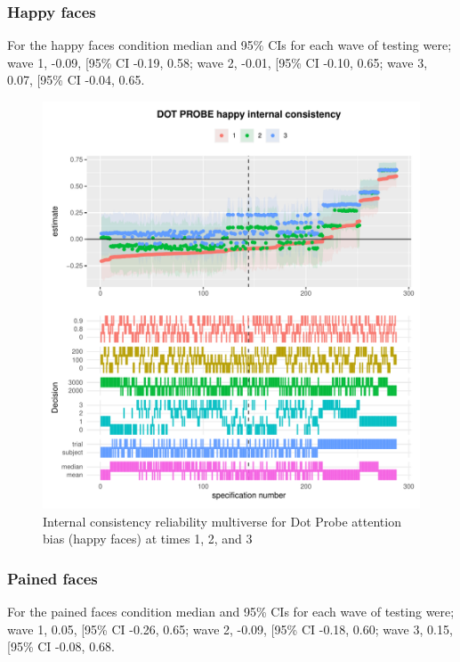 \documentclass[
  english,
  man,floatsintext]{apa6}
\begin{document}
\newpage

\hypertarget{happy-faces}{%
\subsubsection{Happy faces}\label{happy-faces}}

For the happy faces condition median and 95\% CIs for each wave of testing were; wave 1, -0.09, {[}95\% CI -0.19, 0.58; wave 2, -0.01, {[}95\% CI -0.10, 0.65; wave 3, 0.07, {[}95\% CI -0.04, 0.65.

\begin{figure}
\centering
\includegraphics{Reliability_Multiverse_files/figure-latex/unnamed-chunk-14-1.pdf}
\caption{\label{fig:unnamed-chunk-14}Internal consistency reliability multiverse for Dot Probe attention bias (happy faces) at times 1, 2, and 3}
\end{figure}

\newpage

\hypertarget{pained-faces}{%
\subsubsection{Pained faces}\label{pained-faces}}

For the pained faces condition median and 95\% CIs for each wave of testing were; wave 1, 0.05, {[}95\% CI -0.26, 0.65; wave 2, -0.09, {[}95\% CI -0.18, 0.60; wave 3, 0.15, {[}95\% CI -0.08, 0.68.
\end{document}
